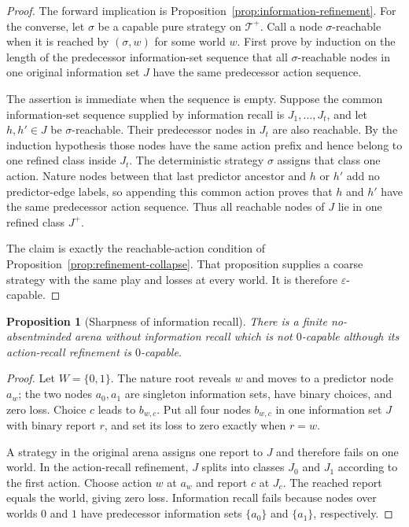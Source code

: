 \documentclass[11pt]{article}
\theoremstyle{plain}
\newtheorem{proposition}[theorem]{Proposition}
\theoremstyle{definition}
\theoremstyle{remark}
\newcommand{\eps}{\varepsilon}
\begin{document}
\begin{proof}
The forward implication is
Proposition~\ref{prop:information-refinement}. For the converse, let $\sigma$
be a capable pure strategy on $\mathcal T^+$. Call a node
$\sigma$-reachable when it is reached by $(\sigma,w)$ for some world $w$.
First prove by induction on the length of the predecessor information-set
sequence that all $\sigma$-reachable nodes in one original information set $J$
have the same predecessor action sequence.

The assertion is immediate when the sequence is empty. Suppose the common
information-set sequence supplied by information recall is
$J_1,\ldots,J_t$, and let $h,h'\in J$ be $\sigma$-reachable. Their predecessor
nodes in $J_t$ are also reachable. By the induction hypothesis those nodes have
the same action prefix and hence belong to one refined class inside $J_t$.
The deterministic strategy $\sigma$ assigns that class one action. Nature nodes
between that last predictor ancestor and $h$ or $h'$ add no predictor-edge
labels, so appending this common action proves that $h$ and $h'$ have the same
predecessor action sequence. Thus all reachable nodes of $J$ lie in one refined class $J^+$.

The claim is exactly the reachable-action condition of
Proposition~\ref{prop:refinement-collapse}. That proposition supplies a coarse
strategy with the same play and losses at every world. It is therefore
$\eps$-capable.
\end{proof}

\begin{proposition}[Sharpness of information recall]
\label{prop:action-recall-sharp}
There is a finite no-absentminded arena without information recall which is not
$0$-capable although its action-recall refinement is $0$-capable.
\end{proposition}

\begin{proof}
Let $W=\{0,1\}$. The nature root reveals $w$ and moves to a predictor node
$a_w$; the two nodes $a_0,a_1$ are singleton information sets, have binary
choices, and zero loss. Choice $c$ leads to $b_{w,c}$. Put all four nodes
$b_{w,c}$ in one information set $J$ with binary report $r$, and set its loss
to zero exactly when $r=w$.

A strategy in the original arena assigns one report to $J$ and therefore fails
on one world. In the action-recall refinement, $J$ splits into classes $J_0$
and $J_1$ according to the first action. Choose action $w$ at $a_w$ and report
$c$ at $J_c$. The reached report equals the world, giving zero loss. Information
recall fails because nodes over worlds $0$ and $1$ have predecessor information
sets $\{a_0\}$ and $\{a_1\}$, respectively.
\end{proof}
\end{document}
